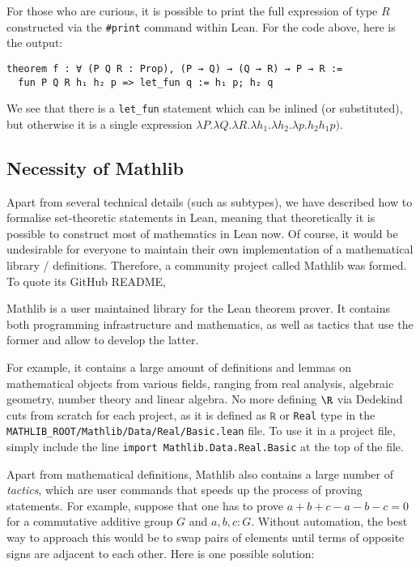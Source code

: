 For those who are curious, it is possible to print the full expression of type \(R\) constructed via the \texttt{#print} command within Lean. For the code above, here is the output:

\begin{verbatim}
theorem f : ∀ (P Q R : Prop), (P → Q) → (Q → R) → P → R :=
  fun P Q R h₁ h₂ p => let_fun q := h₁ p; h₂ q
\end{verbatim}

We see that there is a \texttt{let_fun} statement which can be inlined (or substituted), but otherwise it is a single expression \(\lambda P. \lambda Q. \lambda R. \lambda h_1. \lambda h_2. \lambda p. h_2h_1p)\).

\subsection{Necessity of Mathlib}

Apart from several technical details (such as subtypes), we have described how to formalise set-theoretic statements in Lean, meaning that theoretically it is possible to construct most of mathematics in Lean now. Of course, it would be undesirable for everyone to maintain their own implementation of a mathematical library / definitions. Therefore, a community project called Mathlib was formed. To quote its GitHub README,

\begin{quotationbox}
  Mathlib is a user maintained library for the Lean theorem prover. It contains both programming infrastructure and mathematics, as well as tactics that use the former and allow to develop the latter.
\end{quotationbox}

For example, it contains a large amount of definitions and lemmas on mathematical objects from various fields, ranging from real analysis, algebraic geometry, number theory and linear algebra. No more defining \(\R\) via Dedekind cuts from scratch for each project, as it is defined as \texttt{ℝ} or \texttt{Real} type in the \texttt{MATHLIB_ROOT/Mathlib/Data/Real/Basic.lean} file. To use it in a project file, simply include the line \texttt{import Mathlib.Data.Real.Basic} at the top of the file.

Apart from mathematical definitions, Mathlib also contains a large number of \textit{tactics}, which are user commands that speeds up the process of proving statements. For example, suppose that one has to prove \(a + b + c - a - b - c = 0\) for a commutative additive group \(G\) and \(a, b, c : G\). Without automation, the best way to approach this would be to swap pairs of elements until terms of opposite signs are adjacent to each other. Here is one possible solution:

